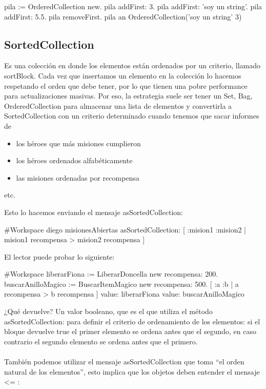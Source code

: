 \documentclass[a4paper,12pt]{book}
\begin{document}
\begin{code}
pila := OrderedCollection new.
pila addFirst: 3.
pila addFirst: 'soy un string'.
pila addFirst: 5.5.
pila removeFirst.
pila
  an OrderedCollection('soy un string' 3)
\end{code}


\subsection{SortedCollection}

Es una colección en donde los elementos están ordenados por un criterio, llamado sortBlock. Cada vez que
insertamos un elemento en la colección lo hacemos respetando el orden que debe tener, por lo que tienen
una pobre performance para actualizaciones masivas. Por eso, la estrategia suele ser tener un Set, Bag,
OrderedCollection para almacenar una lista de elementos y convertirla a SortedCollection con un criterio
determinado cuando tenemos que sacar informes de

\begin{itemize}
 \item los héroes que más misiones cumplieron
 \item los héroes ordenados alfabéticamente
 \item las misiones ordenadas por recompensa
\end{itemize}
etc. 

Esto lo hacemos enviando el mensaje asSortedCollection:

\begin{code}
#Workspace
diego misionesAbiertas asSortedCollection: 
    [ :mision1 :mision2 | mision1 recompensa > mision2 recompensa ]
\end{code}

El lector puede probar lo siguiente:

\begin{code}
#Workspace
liberarFiona := LiberarDoncella new recompensa: 200.
buscarAnilloMagico := BuscarItemMagico new recompensa: 500.
[ :a :b | a recompensa > b recompensa ] 
     value: liberarFiona value: buscarAnilloMagico
\end{code}

¿Qué devuelve? Un valor booleano, que es el que utiliza el método asSortedCollection: para definir el criterio
de ordenamiento de los elementos: si el bloque devuelve true el primer elemento se ordena antes que el segundo,
en caso contrario el segundo elemento se ordena antes que el primero.
\\
\\
También podemos utilizar el mensaje asSortedCollection que toma ``el orden natural de los elementos'',
esto implica que los objetos deben entender el mensaje \textless= :
\end{document}
